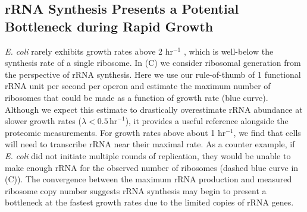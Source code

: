 \subsection{rRNA Synthesis Presents a Potential Bottleneck during Rapid Growth}

\textit{E. coli} rarely exhibits growth rates above 2 hr$^{-1}$
\citep{bremer2008,roller2016}, which is well-below the synthesis rate of a
single ribosome. In (C) we consider ribosomal generation
from the perspective of rRNA synthesis. Here we use our rule-of-thumb of 1
functional rRNA unit per second per operon and estimate the maximum number of
ribosomes that could  be made as a function of growth rate (blue curve).
Although we expect this estimate to drastically overestimate rRNA abundance at
slower growth rates ($\lambda < 0.5\, \text{hr}^{-1}$), it provides a useful
reference alongside the proteomic measurements. For growth rates above about 1
hr$^{-1}$, we find that cells will need to transcribe rRNA near their maximal
rate. As a counter example, if \textit{E. coli} did not initiate multiple rounds
of replication, they would be unable to make enough rRNA for the observed number
of ribosomes (dashed blue curve in (C)). The convergence
between the maximum rRNA production and measured ribosome copy number suggests
rRNA synthesis may begin to present a bottleneck at the fastest growth rates due
to the limited copies of rRNA genes.

